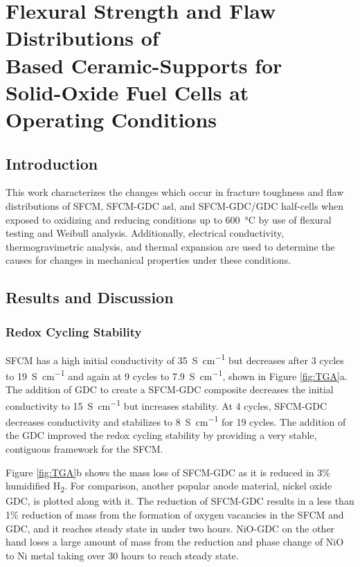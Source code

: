
\chapter[Flexural Strength and Flaw Distributions of \ce{SrFe_{0.2}Co_{0.4}Mo_{0.4}O_{3-\delta}} Based Ceramic-Supports for SOFCs at Operating Conditions]{Flexural Strength and Flaw Distributions of\\  Based Ceramic-Supports for \\Solid-Oxide Fuel Cells at Operating Conditions}

\section{Introduction}
    This work characterizes the changes which occur in fracture toughness and flaw distributions of SFCM, SFCM-GDC \gls{asl}, and SFCM-GDC/GDC half-cells when exposed to oxidizing and reducing conditions up to \SI{600}{\celsius} by use of flexural testing and Weibull analysis.
    Additionally, electrical conductivity, thermogravimetric analysis, and thermal expansion are used to determine the causes for changes in mechanical properties under these conditions.

\section{Results and Discussion}
    \subsection{Redox Cycling Stability}
        SFCM has a high initial conductivity of \SI{35}{S\per\centi\meter} but decreases after 3 cycles to \SI{19}{S\per\centi\meter} and again at 9 cycles to \SI{7.9}{S\per\centi\meter}, shown in Figure \ref{fig:TGA}a.
        The addition of GDC to create a SFCM-GDC composite decreases the initial conductivity to \SI{15}{S\per\centi\meter} but increases stability.
        At 4 cycles, SFCM-GDC decreases conductivity and stabilizes to \SI{8}{S\per\centi\meter} for 19 cycles.
        The addition of the GDC improved the redox cycling stability by providing a very stable, contiguous framework for the SFCM.\cite{Mogensen2000,Duncan2006,Bishop2009}

        Figure \ref{fig:TGA}b shows the mass loss of SFCM-GDC as it is reduced in 3\% humidified H\textsubscript{2}.
        For comparison, another popular anode material, nickel oxide GDC, is plotted along with it.
        The reduction of SFCM-GDC results in a less than 1\% reduction of mass from the formation of oxygen vacancies in the SFCM and GDC, and it reaches steady state in under two hours.
        NiO-GDC on the other hand loses a large amount of mass from the reduction and phase change of NiO to Ni metal taking over 30 hours to reach steady state.

